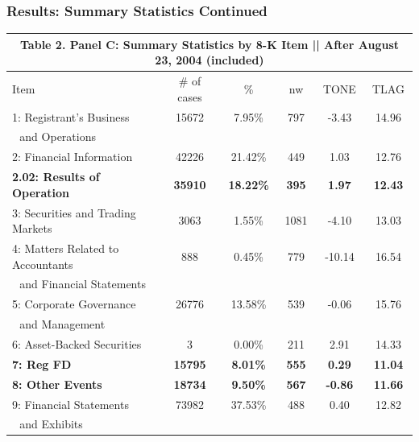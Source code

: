 \documentclass{beamer}
\begin{document}
\begin{frame}[noframenumbering]
\frametitle{Results: Summary Statistics Continued}

\begin{table}[H]   \label{T2PC}%
\begin{center} \scriptsize
	\begin{tabular}{lccccc}
		\multicolumn{6}{c}{\textbf{Table 2. Panel C: Summary Statistics by 8-K Item || After August 23, 2004 (included)}} \\
		\midrule
		\midrule
		Item & \multicolumn{1}{c}{\# of cases} & \multicolumn{1}{c}{\% } & \multicolumn{1}{c}{nw} & \multicolumn{1}{c}{TONE} & \multicolumn{1}{c}{TLAG} \\
		\midrule
		1: Registrant's Business & 15672 & 7.95\% & 797 & -3.43 & 14.96 \\
		\: \,\, and Operations & &  &  &  & \\
		2: Financial Information & 42226 & 21.42\% & 449 & 1.03 & 12.76 \\
		\textbf{2.02: Results of Operation} & \textbf{35910} & \textbf{18.22\%} & \textbf{395} & \textbf{1.97} & \textbf{12.43} \\
		3: Securities and Trading Markets & 3063 & 1.55\% & 1081 & -4.10 & 13.03 \\
		4: Matters Related to Accountants & 888 & 0.45\% & 779 & -10.14 & 16.54 \\
		\: \,\, and Financial Statements & &  &  &  & \\
		5: Corporate Governance & 26776 & 13.58\% & 539 & -0.06 & 15.76 \\
		\: \,\, and Management & &  &  &  & \\
		6: Asset-Backed Securities & 3 & 0.00\% & 211 & 2.91 & 14.33 \\
		\textbf{7: Reg FD} & \textbf{15795} & \textbf{8.01\%} & \textbf{555} & \textbf{0.29} & \textbf{11.04} \\
		\textbf{8: Other Events} & \textbf{18734} & \textbf{9.50\%} & \textbf{567} & \textbf{-0.86} & \textbf{11.66} \\
		9: Financial Statements & 73982 & 37.53\% & 488 & 0.40 & 12.82 \\
		\: \,\, and Exhibits & &  &  &  & \\
		\bottomrule
		\bottomrule
	\end{tabular}%
\end{center}
\end{table}%



\end{frame}
\end{document}
